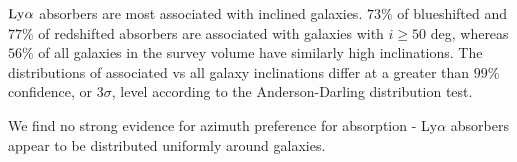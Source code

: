 \documentclass[iop]{emulateapj-rtx4}
\begin{document}
\textbullet \indent $\rm Ly\alpha$ absorbers are most associated with inclined galaxies. $73\%$ of blueshifted and $77\%$ of redshifted absorbers are associated with galaxies with $i \geq 50$ deg, whereas $56\%$ of all galaxies in the survey volume have similarly high inclinations. The distributions of associated vs all galaxy inclinations differ at a greater than $99\%$ confidence, or $3\sigma$, level according to the Anderson-Darling distribution test.

\indent \textbullet \indent We find no strong evidence for azimuth preference for absorption - Ly$\alpha$ absorbers appear to be distributed uniformly around galaxies.


\nocite{*}


\end{document}
